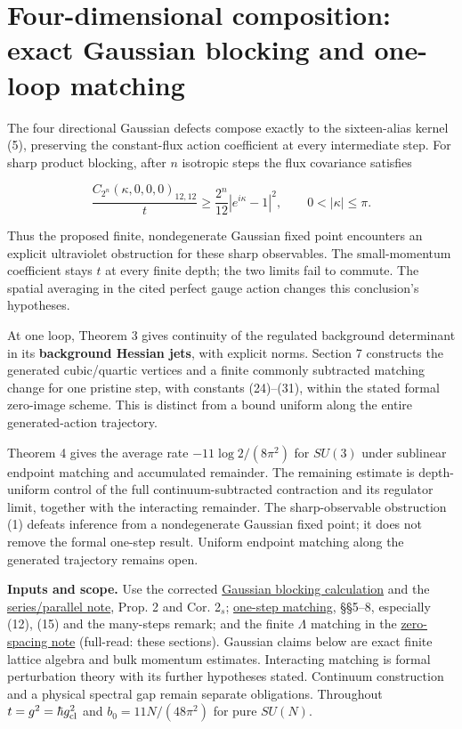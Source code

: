 \documentclass[11pt,a4paper]{article}
\begin{document}
\hypertarget{four-dimensional-composition-exact-gaussian-blocking-and-one-loop-matching}{%
\section{Four-dimensional composition: exact Gaussian blocking and
one-loop
matching}\label{four-dimensional-composition-exact-gaussian-blocking-and-one-loop-matching}}

The four directional Gaussian defects compose exactly to the
sixteen-alias kernel (5), preserving the constant-flux action
coefficient at every intermediate step. For sharp product blocking,
after \(n\) isotropic steps the flux covariance satisfies

\[\frac{C_{2^n}(\kappa,0,0,0)_{12,12}}t
 \ge \frac{2^n}{12}|e^{i\kappa}-1|^2,
 \qquad 0<|\kappa|\le\pi. \tag{1}\]

Thus the proposed finite, nondegenerate Gaussian fixed point encounters
an explicit ultraviolet obstruction for these sharp observables. The
small-momentum coefficient stays \(t\) at every finite depth; the two
limits fail to commute. The spatial averaging in the cited perfect gauge
action changes this conclusion's hypotheses.

At one loop, Theorem 3 gives continuity of the regulated background
determinant in its \textbf{background Hessian jets}, with explicit
norms. Section 7 constructs the generated cubic/quartic vertices and a
finite commonly subtracted matching change for one pristine step, with
constants (24)--(31), within the stated formal zero-image scheme. This
is distinct from a bound uniform along the entire generated-action
trajectory.

Theorem 4 gives the average rate \(-11\log2/(8\pi^2)\) for \(SU(3)\)
under sublinear endpoint matching and accumulated remainder. The
remaining estimate is depth-uniform control of the full
continuum-subtracted contraction and its regulator limit, together with
the interacting remainder. The sharp-observable obstruction (1) defeats
inference from a nondegenerate Gaussian fixed point; it does not remove
the formal one-step result. Uniform endpoint matching along the
generated trajectory remains open.

\textbf{Inputs and scope.} Use the corrected
\href{gaussian-blocking-coupling.md}{Gaussian blocking calculation} and
the \href{series-parallel-gauge-refinement.md}{series/parallel note},
Prop. 2 and Cor. 2\(_s\);
\href{four-dimensional-parallel-log.md}{one-step matching}, §§5--8,
especially (12), (15) and the many-steps remark; and the finite
\(\Lambda\) matching in the
\href{zero-spacing-any-action.md}{zero-spacing note} (full-read: these
sections). Gaussian claims below are exact finite lattice algebra and
bulk momentum estimates. Interacting matching is formal perturbation
theory with its further hypotheses stated. Continuum construction and a
physical spectral gap remain separate obligations. Throughout
\(t=g^2=\hbar g_{\rm cl}^2\) and \(b_0=11N/(48\pi^2)\) for pure
\(SU(N)\).
\end{document}

